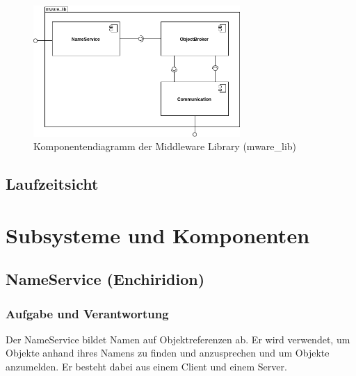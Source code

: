 \documentclass{article}
\begin{document}
\begin{figure}[H]
    \centering
    \includegraphics[width=0.7\textwidth]{Middleware_Components.png}
    \caption[middleware-components]{Komponentendiagramm der Middleware Library (mware\_lib)}
    \label{fig:middleware-components-diagram}
\end{figure}

\subsection{Laufzeitsicht}

\newpage

\section{Subsysteme und Komponenten}

\subsection{NameService (Enchiridion)}
\subsubsection{Aufgabe und Verantwortung}
Der NameService bildet Namen auf Objektreferenzen ab. Er wird verwendet, um Objekte anhand
ihres Namens zu finden und anzusprechen und um Objekte anzumelden. Er besteht dabei aus einem Client und einem Server.
\end{document}

